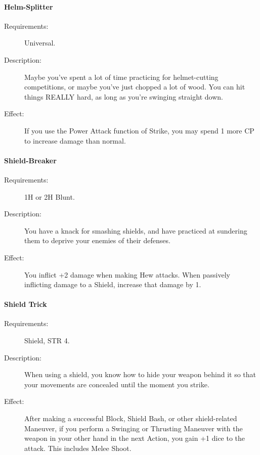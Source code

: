 \documentclass[oneside,11pt,english]{book}
\begin{document}
\paragraph{\label{talent:Helm-Splitter}Helm-Splitter}
\begin{description}
	\item [Requirements:] Universal. 
	\item [Description:] Maybe you've spent a lot of time practicing for helmet-cutting competitions, or maybe 
	you've just chopped a lot of wood. You can hit things REALLY hard, as long as you’re swinging straight 
	down. 
	\item [Effect:] If you use the Power Attack function of Strike, you may spend 1 more CP to increase damage 
	than normal. 
	
\end{description}
\paragraph{\label{talent:Shield-Breaker}Shield-Breaker}
\begin{description}
	\item [Requirements:] 1H or 2H Blunt. 
	\item [Description:] You have a knack for smashing shields, and have practiced at sundering them to deprive 
	your enemies of their defenses. 
	\item [Effect:] You inflict +2 damage when making Hew attacks. When passively inflicting damage to a Shield, 
	increase that damage by 1. 
	
\end{description}
\paragraph{\label{talent:Shield Trick}Shield Trick}
\begin{description}
	\item [Requirements:] Shield, STR 4. 
	\item [Description:] When using a shield, you know how to hide your weapon behind it so that your movements 
	are concealed until the moment you strike. 
	\item [Effect:] After making a successful Block, Shield Bash, or other shield-related Maneuver, if you perform a 
	Swinging or Thrusting Maneuver with the weapon in your other hand in the next Action, you gain +1 dice 
	to the attack. This includes Melee Shoot.
	
\end{description}
\end{document}
